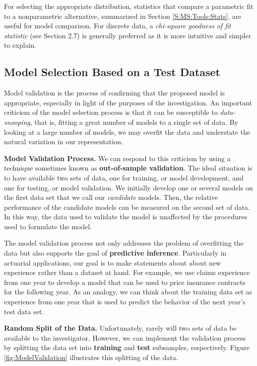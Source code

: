\documentclass[]{book}
\theoremstyle{definition}
\theoremstyle{definition}
\theoremstyle{definition}
\theoremstyle{remark}
\begin{document}
For selecting the appropriate distribution, statistics that compare a
parametric fit to a nonparametric alternative, summarized in Section
\ref{S:MS:Tools:Stats}, are useful for model comparison. For discrete
data, a \emph{chi-square goodness of fit statistic} (see Section 2.7) is
generally preferred as it is more intuitive and simpler to explain.

\subsection{Model Selection Based on a Test
Dataset}\label{model-selection-based-on-a-test-dataset}

Model validation is the process of confirming that the proposed model is
appropriate, especially in light of the purposes of the investigation.
An important criticism of the model selection process is that it can be
susceptible to \emph{data-snooping}, that is, fitting a great number of
models to a single set of data. By looking at a large number of models,
we may overfit the data and understate the natural variation in our
representation.

\textbf{Model Validation Process.} We can respond to this criticism by
using a technique sometimes known as \textbf{out-of-sample validation}.
The ideal situation is to have available two sets of data, one for
training, or model development, and one for testing, or model
validation. We initially develop one or several models on the first data
set that we call our \emph{candidate} models. Then, the relative
performance of the candidate models can be measured on the second set of
data. In this way, the data used to validate the model is unaffected by
the procedures used to formulate the model.

The model validation process not only addresses the problem of
overfitting the data but also supports the goal of \textbf{predictive
inference}. Particularly in actuarial applications, our goal is to make
statements about about new experience rather than a dataset at hand. For
example, we use claims experience from one year to develop a model that
can be used to price insurance contracts for the following year. As an
analogy, we can think about the training data set as experience from one
year that is used to predict the behavior of the next year's test data
set.

\textbf{Random Split of the Data.} Unfortunately, rarely will two sets
of data be available to the investigator. However, we can implement the
validation process by splitting the data set into \textbf{training} and
\textbf{test} subsamples, respectively. Figure \ref{fig:ModelValidation}
illustrates this splitting of the data.
\end{document}
